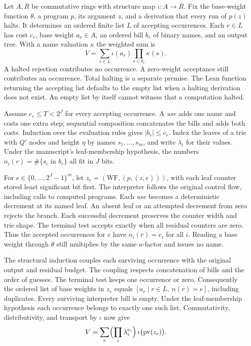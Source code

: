 \clearpage
{}\label{sec:15k4}

Let $A,R$ be commutative rings with structure map $\iota:A\to R$.
Fix the base-weight function $\theta$, a program $p$, its argument $z$, and a
derivation that every run of $p(z)$ halts. It determines an ordered finite
list $L$ of accepting occurrences. Each $r\in L$ has cost $c_r$, base
weight $a_r\in A$, an ordered bill $b_r$ of binary names, and an output
tree. With a name valuation $\kappa$ the weighted sum is
\[
 V=\sum_{r\in L}\iota(a_r)\prod_{s\in b_r}\kappa(s).
\]
A halted rejection contributes no occurrence. A zero-weight acceptance
still contributes an occurrence. Total halting is a separate premise. The Lean function returning the accepting list defaults to the empty list
when a halting derivation does not exist. An empty list by itself cannot
witness that a computation halted.

Assume $c_r\le T<2^J$ for every accepting occurrence. A \emph{use} adds
one name and costs one extra step; sequential composition concatenates
the bills and adds both costs. Induction over the evaluation rules gives
$|b_r|\le c_r$. Index the leaves of a trie with $Q'$ nodes and height
$\eta$ by names $s_1,\ldots,s_m$, and write $\lambda_i$ for their
values. Under the manuscript's leaf-membership hypothesis, the numbers
$n_i(r)=\#\{s_i\text{ in }b_r\}$ all fit in $J$ bits.

For $e\in\{0,\ldots,2^J-1\}^m$, let $z_e=(\mathrm{WF},(p,(z,e)))$,
with each leaf counter stored least significant bit first. The interpreter
follows the original control flow, including calls to computed programs.
Each \emph{use} becomes a deterministic decrement at its named leaf.
An absent leaf or an attempted decrement from zero rejects the branch.
Each successful decrement preserves the counter width and trie shape.
The terminal test accepts exactly when all residual counters are zero.
Thus the accepted occurrences for $e$ have $n_i(r)=e_i$ for all $i$.
Reading a base weight through $\theta$ still multiplies by the same
$a$-factor and issues no name.

The structural induction couples each surviving occurrence with the original
output and residual budget. The coupling respects concatenation of bills
and the order of guesses. The terminal test keeps one occurrence or zero.
Consequently the ordered list of base weights in $z_e$ equals
$[a_r\mid r\in L,\ n(r)=e]$, including duplicates. Every surviving
interpreter bill is empty. Under the leaf-membership hypothesis each
occurrence belongs to exactly one such list. Commutativity, distributivity,
and transport by $\iota$ now give
\[
 V=\sum_e \Bigl(\prod_i\lambda_i^{e_i}\Bigr)\,\iota\bigl(\mathrm{pv}(z_e)\bigr).
\]

